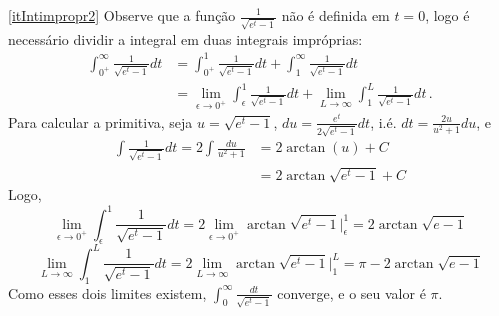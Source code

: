 \begin{exo}
\begin{sol}
\eqref{itIntimpropr2}
Observe que a função $\frac{1}{\sqrt{e^t-1}}$ não é definida em $t=0$, logo é
necessário dividir a integral em duas integrais impróprias: 
\begin{align*}
\int_{0^+}^\infty\frac{1}{\sqrt{e^t-1}}dt&=\int_{0^+}^1\frac{1}{\sqrt{e^t-1}}
dt+\int_1^\infty\frac{1}{\sqrt{e^t-1}}dt\\
&=\lim_{\epsilon\to 0^+}\int_\epsilon^1\frac{1}{\sqrt{e^t-1}}dt+\lim_{L\to
\infty}\int_1^L\frac{1}{\sqrt{e^t-1}}dt\,.
\end{align*}
Para calcular a primitiva, seja $u=\sqrt{e^t-1}$,
$du=\frac{e^t}{2\sqrt{e^t-1}}dt$, i.é. $dt=\frac{2u}{u^2+1}du$, e 
\begin{align*}
\int\frac{1}{\sqrt{e^t-1}}dt=2\int\frac{du}{u^2+1} &=2\arctan (u)+C\\
&=2\arctan\sqrt{e^t-1}+C
\end{align*}
Logo,
$$\lim_{\epsilon\to
0^+}\int_\epsilon^1\frac{1}{\sqrt{e^t-1}}dt=2\lim_{\epsilon\to
0^+}\arctan\sqrt{e^t-1}\big|_\epsilon^1=2\arctan\sqrt{e-1}$$
$$\lim_{L\to \infty}\int_1^L\frac{1}{\sqrt{e^t-1}}dt=2\lim_{L\to
\infty}\arctan\sqrt{e^t-1}\big|_1^L=\pi-2\arctan\sqrt{e-1}$$
Como esses dois limites existem, 
$\int_0^\infty\frac{dt}{\sqrt{e^t-1}}$ {converge, e o seu valor é
$\pi$}.
\end{sol}
\end{exo}



